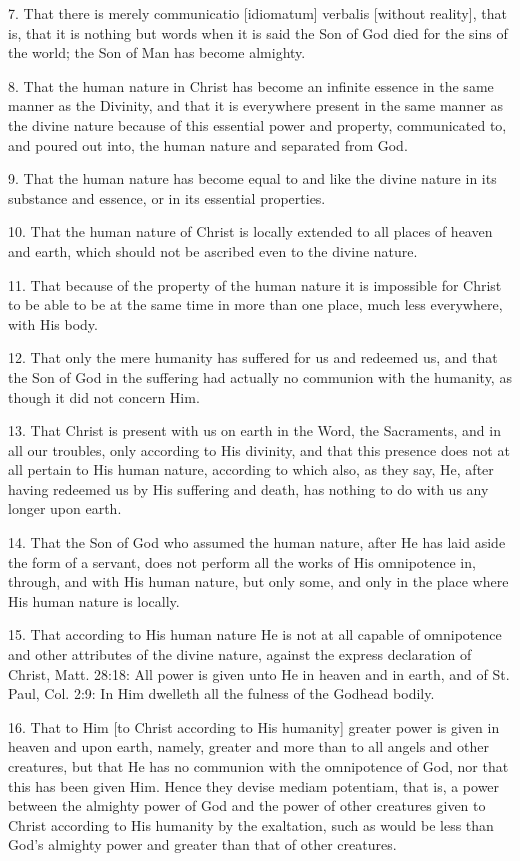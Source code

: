 7. That there is merely communicatio [idiomatum] verbalis [without reality], that is, that it is nothing but words when it is said the Son of God died for the sins of the world; the Son of Man has become almighty.

8. That the human nature in Christ has become an infinite essence in the same manner as the Divinity, and that it is everywhere present in the same manner as the divine nature because of this essential power and property, communicated to, and poured out into, the human nature and separated from God.

9. That the human nature has become equal to and like the divine nature in its substance and essence, or in its essential properties.

10. That the human nature of Christ is locally extended to all places of heaven and earth, which should not be ascribed even to the divine nature.

11. That because of the property of the human nature it is impossible for Christ to be able to be at the same time in more than one place, much less everywhere, with His body.

12. That only the mere humanity has suffered for us and redeemed us, and that the Son of God in the suffering had actually no communion with the humanity, as though it did not concern Him.

13. That Christ is present with us on earth in the Word, the Sacraments, and in all our troubles, only according to His divinity, and that this presence does not at all pertain to His human nature, according to which also, as they say, He, after having redeemed us by His suffering and death, has nothing to do with us any longer upon earth.

14. That the Son of God who assumed the human nature, after He has laid aside the form of a servant, does not perform all the works of His omnipotence in, through, and with His human nature, but only some, and only in the place where His human nature is locally.

15. That according to His human nature He is not at all capable of omnipotence and other attributes of the divine nature, against the express declaration of Christ, Matt. 28:18: All power is given unto He in heaven and in earth, and of St. Paul, Col. 2:9: In Him dwelleth all the fulness of the Godhead bodily.

16. That to Him [to Christ according to His humanity] greater power is given in heaven and upon earth, namely, greater and more than to all angels and other creatures, but that He has no communion with the omnipotence of God, nor that this has been given Him. Hence they devise mediam potentiam, that is, a power between the almighty power of God and the power of other creatures given to Christ according to His humanity by the exaltation, such as would be less than God's almighty power and greater than that of other creatures.

